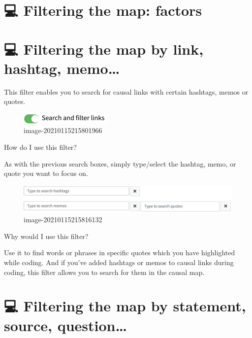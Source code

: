 \documentclass[
]{book}
\begin{document}
\hypertarget{filtering-the-map-factors}{%
\section{💻 Filtering the map: factors}\label{filtering-the-map-factors}}

\hypertarget{filtering-the-map-by-link-hashtag-memo}{%
\section{💻 Filtering the map by link, hashtag, memo\ldots{}}\label{filtering-the-map-by-link-hashtag-memo}}

This filter enables you to search for causal links with certain hashtags, memos or quotes.

\begin{figure}
\centering
\includegraphics{_assets/image-20210115215801966.png}
\caption{image-20210115215801966}
\end{figure}

How do I use this filter?

As with the previous search boxes, simply type/select the hashtag, memo, or quote you want to focus on.

\begin{figure}
\centering
\includegraphics{_assets/image-20210115215816132.png}
\caption{image-20210115215816132}
\end{figure}

Why would I use this filter?

Use it to find words or phrases in specific quotes which you have highlighted while coding. And if you've added hashtags or memos to causal links during coding, this filter allows you to search for them in the causal map.

\hypertarget{filtering-the-map-by-statement-source-question}{%
\section{💻 Filtering the map by statement, source, question\ldots{}}\label{filtering-the-map-by-statement-source-question}}
\end{document}
